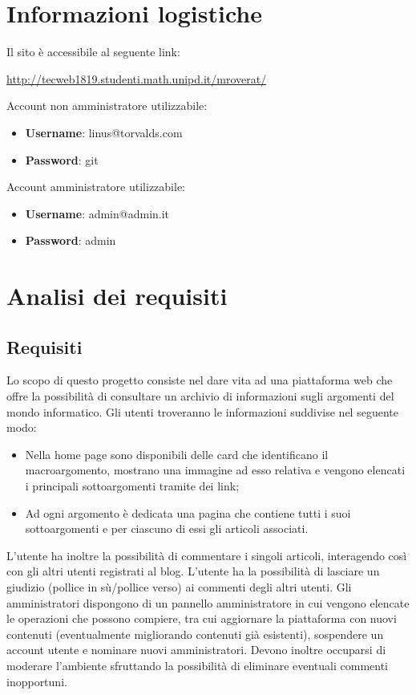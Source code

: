 \documentclass[12pt]{article}
\begin{document}
	
	
	\section*{Informazioni logistiche}
	
	Il sito è accessibile al seguente link:
	\begin{center}
		\url{http://tecweb1819.studenti.math.unipd.it/mroverat/}
	\end{center}
	
	Account non amministratore utilizzabile:
	\begin{itemize}
		\item \textbf{Username}: linus@torvalds.com
		\item \textbf{Password}: git
	\end{itemize}
	
	Account amministratore utilizzabile:
	\begin{itemize}
		\item \textbf{Username}: admin@admin.it
		\item \textbf{Password}: admin
	\end{itemize}

	\newpage
	
	\tableofcontents
	
	\newpage

	\section{Analisi dei requisiti}
		\subsection{Requisiti}
		Lo scopo di questo progetto consiste nel dare vita ad una piattaforma web che offre la possibilità di consultare un archivio di informazioni sugli argomenti del mondo informatico. Gli utenti troveranno le informazioni suddivise nel seguente modo:
		\begin{itemize}
			\item Nella home page sono disponibili delle card che identificano il macroargomento, mostrano una immagine ad esso relativa e vengono elencati i principali sottoargomenti tramite dei link;
			\item Ad ogni argomento è dedicata una pagina che contiene tutti i suoi sottoargomenti e per ciascuno di essi gli articoli associati.
		\end{itemize}
		 L'utente ha inoltre la possibilità di commentare i singoli articoli, interagendo così con gli altri utenti registrati al blog. L'utente ha la possibilità di lasciare un giudizio (pollice in sù/pollice verso) ai commenti degli altri utenti. Gli amministratori dispongono di un pannello amministratore in cui vengono elencate le operazioni che possono compiere, tra cui aggiornare la piattaforma con nuovi contenuti (eventualmente migliorando contenuti già esistenti), sospendere un account utente e nominare nuovi amministratori.
		Devono inoltre occuparsi di moderare l'ambiente sfruttando la possibilità di eliminare eventuali commenti inopportuni.
\end{document}
